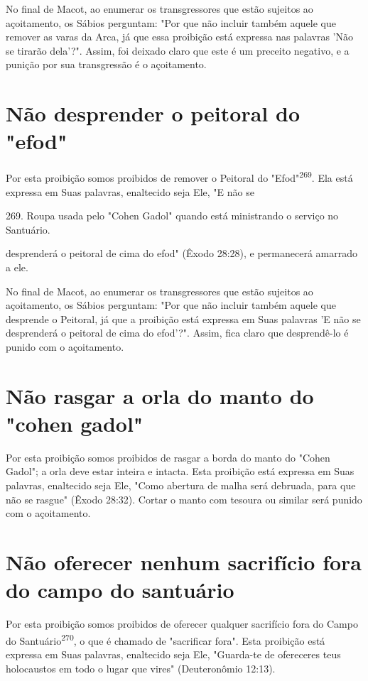\begin{itemize}
\begin{enumrate}
\begin{itemize}
\begin{itemize}
\begin{itemize}
No final de Macot, ao enumerar os transgressores que estão sujeitos ao
açoitamento, os Sábios perguntam: "Por que não incluir também aquele que
remover as varas da Arca, já que essa proibição está expressa nas
palavras 'Não se tirarão dela'?". Assim, foi deixado claro que este é um
preceito negativo, e a punição por sua transgressão é o açoitamento.

\section{Não desprender o peitoral do "efod"}

Por esta proibição somos proibidos de remover o Peitoral do
"Efod"\textsuperscript{269}. Ela está expressa em Suas palavras,
enaltecido seja Ele, "E não se

269. Roupa usada pelo "Cohen Gadol" quando está ministrando o serviço no
Santuário.

desprenderá o peitoral de cima do efod" (Êxodo 28:28), e permanecerá
amar­rado a ele.

No final de Macot, ao enumerar os transgressores que estão sujeitos ao
açoitamento, os Sábios perguntam: "Por que não incluir também aquele que
desprende o Peitoral, já que a proibição está expressa em Suas palavras
'E não se desprenderá o peitoral de cima do efod'?". Assim, fica claro
que desprendê-lo é punido com o açoitamento.

\section{Não rasgar a orla do manto do "cohen gadol"}

Por esta proibição somos proibidos de rasgar a borda do manto do "Cohen
Gadol"; a orla deve estar inteira e intacta. Esta proibição está
expressa em Suas palavras, enaltecido seja Ele, "Como abertura de malha
será debruada, para que não se rasgue" (Êxodo 28:32). Cortar o manto com
tesoura ou similar será punido com o açoitamento.

\section{Não oferecer nenhum sacrifício fora do campo do santuário}

Por esta proibição somos proibidos de oferecer qualquer sacrifício fora
do Campo do Santuário\textsuperscript{270}, o que é chamado de
"sacrificar fora". Esta proibição está expressa em Suas palavras,
enaltecido seja Ele, "Guarda-te de ofe­receres teus holocaustos em todo
o lugar que vires" (Deuteronômio 12:13).


\end{itemize}
\end{itemize}
\end{itemize}
\end{enumrate}
\end{itemize}
